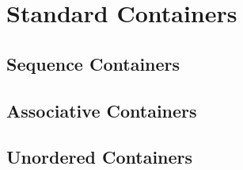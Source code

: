 \documentclass{article}
\title{\thistitle}
\author{\me}
\date{\today}
\begin{document}
\maketitle
\tableofcontents
\pagebreak

\section{Standard Containers}

\subsection{Sequence Containers}

\subsubsection{}

\subsubsection{}

\subsubsection{}

\subsubsection{}

\subsection{Associative Containers}

\subsubsection{}

\subsubsection{}

\subsection{Unordered Containers}
\end{document}
